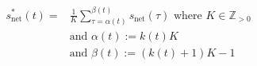\begin{equation}
\begin{split}
	s^{*}_\text{net}(t) =& \frac{1}{K}\sum_{\tau=\alpha(t)}^{\beta(t)}s_\text{net}(\tau) \text{ where } K \in \mathbb{Z}_{>0} \\
	&\text{and } \alpha(t) := k(t)K \\
	&\text{and } \beta(t) := (k(t)+1)K-1
\end{split}
	\label{ch1:equ:down-sampling-to-half-hourly}
\end{equation}